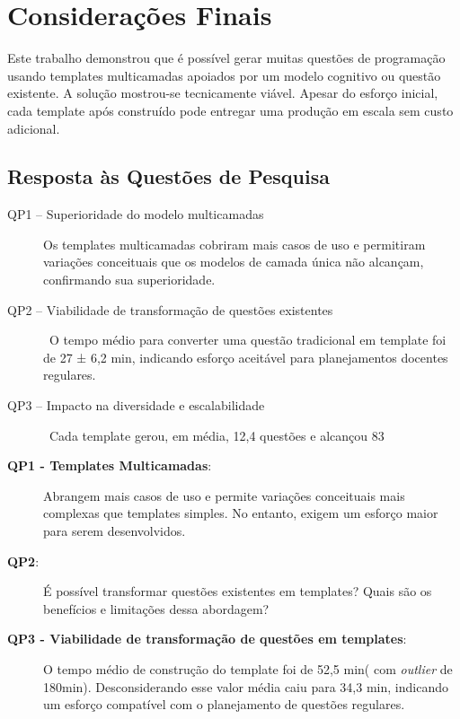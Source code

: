 \chapter{Considerações Finais}

Este trabalho demonstrou que é possível gerar muitas questões de programação usando templates multicamadas apoiados por um modelo cognitivo ou questão existente. A solução mostrou-se tecnicamente viável. Apesar do esforço inicial, cada template após construído pode entregar uma produção em escala sem custo adicional. 

\section{Resposta às Questões de Pesquisa }

\begin{description}
\item[QP1 – Superioridade do modelo multicamadas]
Os templates multicamadas cobriram mais casos de uso e permitiram variações conceituais que os modelos de camada única não alcançam, confirmando sua superioridade.
\item[QP2 – Viabilidade de transformação de questões existentes]\hfill\
O tempo médio para converter uma questão tradicional em template foi de 27 ± 6,2 min, indicando esforço aceitável para planejamentos docentes regulares.
\item[QP3 – Impacto na diversidade e escalabilidade]\hfill\
Cada template gerou, em média, 12,4 questões e alcançou 83 %
\end{description}

\begin{description}
    \item[\textbf{QP1 - Templates Multicamadas}:] Abrangem mais casos de uso e permite variações conceituais mais complexas que templates simples. No entanto, exigem um esforço maior para serem desenvolvidos.
    \item[\textbf{QP2}:] É possível transformar questões existentes em templates? Quais são os benefícios e limitações dessa abordagem?
    \item[\textbf{QP3 - Viabilidade de transformação de questões em templates}:] O tempo médio de construção do template foi de 52,5 min( com \textit{outlier} de 180min). Desconsiderando esse valor média caiu para 34,3 min, indicando um esforço compatível com o planejamento de questões regulares.     
    
\end{description}




